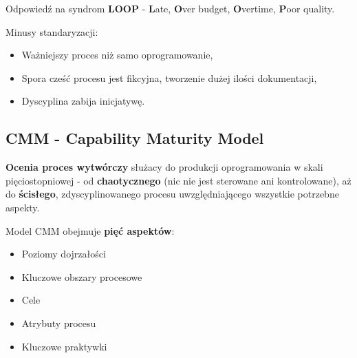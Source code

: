 \documentclass[../main.tex]{subfiles}
\begin{document}
    Odpowiedź na syndrom \textbf{LOOP} - \textbf{L}ate, \textbf{O}ver budget, \textbf{O}vertime, \textbf{P}oor quality.

    Minusy standaryzacji:
    \begin{itemize}
        \item Ważniejszy proces niż samo oprogramowanie,
        \item Spora cześć procesu jest fikcyjna, tworzenie dużej ilości dokumentacji,
        \item Dyscyplina zabija inicjatywę.
    \end{itemize}

    \subsection{CMM - Capability Maturity Model}
    \textbf{Ocenia proces wytwórczy} służacy do produkcji oprogramowania w skali pięciostopniowej - od \textbf{chaotycznego} (nic nie jest
    sterowane ani kontrolowane), aż do \textbf{ścisłego}, zdyscyplinowanego procesu uwzględniającego wszystkie potrzebne aspekty.

    Model CMM obejmuje \textbf{pięć aspektów}:
    \begin{itemize}
        \item Poziomy dojrzałości
        \item Kluczowe obszary procesowe
        \item Cele
        \item Atrybuty procesu
        \item Kluczowe praktywki
    \end{itemize}
\end{document}
